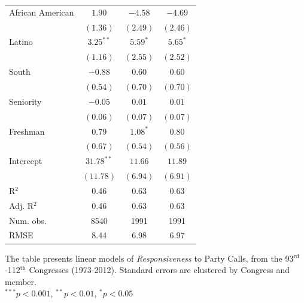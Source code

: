 \documentclass[12pt]{article}
\begin{document}
\begin{table}[!htbp]
\begin{threeparttable}
\begin{tabular}{l c c c }
African American      & $1.90$       & $-4.58$      & $-4.69$       \\
                      & $(1.36)$     & $(2.49)$     & $(2.46)$      \\
Latino                & $3.25^{**}$  & $5.59^{*}$   & $5.65^{*}$    \\
                      & $(1.16)$     & $(2.55)$     & $(2.52)$      \\
South                 & $-0.88$      & $0.60$       & $0.60$        \\
                      & $(0.54)$     & $(0.70)$     & $(0.70)$      \\
Seniority             & $-0.05$      & $0.01$       & $0.01$        \\
                      & $(0.06)$     & $(0.07)$     & $(0.07)$      \\
Freshman              & $0.79$       & $1.08^{*}$   & $0.80$        \\
                      & $(0.67)$     & $(0.54)$     & $(0.56)$      \\
Intercept             & $31.78^{**}$ & $11.66$      & $11.89$       \\
                      & $(11.78)$    & $(6.94)$     & $(6.91)$      \\
\hline
R$^2$                 & 0.46         & 0.63         & 0.63          \\
Adj. R$^2$            & 0.46         & 0.63         & 0.63          \\
Num. obs.             & 8540         & 1991         & 1991          \\
RMSE                  & 8.44         & 6.98         & 6.97          \\
\hline

\end{tabular}
\begin{tablenotes}
  \item
  The table presents linear models of \textit{Responsiveness} to Party Calls,
  from the 93$^{\text{rd}}$-112$^{\text{th}}$ Congresses (1973-2012).
  Standard errors are clustered by Congress and member.\\
  $^{***}p<0.001$, $^{**}p<0.01$, $^*p<0.05$
 \end{tablenotes}
\end{threeparttable}
\end{table}
\end{document}
